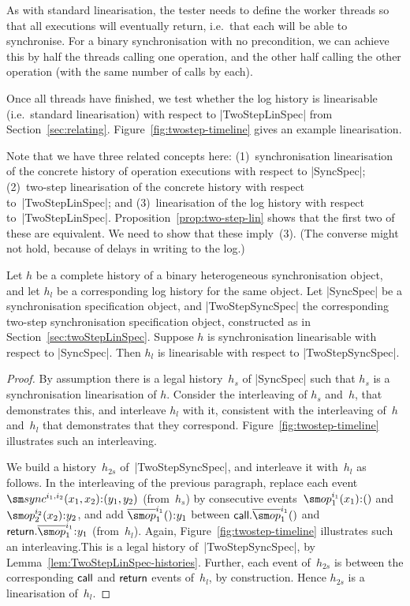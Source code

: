 
As with standard linearisation, the tester needs to define the worker
threads so that all executions will eventually return, i.e.~that each will be
able to synchronise.  For a binary synchronisation with no precondition, we
can achieve this by half the threads calling one operation, and the other half
calling the other operation (with the same number of calls by each).

Once all threads have finished, we test whether the log history is
linearisable (i.e.~standard linearisation) with respect to |TwoStepLinSpec|
from Section~\ref{sec:relating}.  Figure~\ref{fig:twostep-timeline} gives an
example linearisation. 

Note that we have three related concepts here: (1)~synchronisation
linearisation of the concrete history of operation executions with respect to
|SyncSpec|; (2)~two-step linearisation of the concrete history with respect
to~|TwoStepLinSpec|; and (3)~linearisation of the log history with respect
to~|TwoStepLinSpec|.  Proposition~\ref{prop:two-step-lin} shows that the first
two of these are equivalent.  We need to show that these imply~(3).  (The
converse might not hold, because of delays in writing to the log.)

\begin{prop}
\label{prop:twostep-testing}
Let $h$ be a complete history of a binary heterogeneous synchronisation
object, and let $h_l$ be a corresponding log history for the same object.  Let
|SyncSpec| be a synchronisation specification object, and |TwoStepSyncSpec|
the corresponding two-step synchronisation specification object, constructed
as in Section~\ref{sec:twoStepLinSpec}.  Suppose $h$ is synchronisation
linearisable with respect to |SyncSpec|.  Then $h_l$ is linearisable with
respect to |TwoStepSyncSpec|.
\end{prop}
%
\begin{proof}
By assumption there is a legal history~$h_s$ of |SyncSpec| such that $h_s$ is
a synchronisation linearisation of $h$.  Consider the interleaving of $h_s$
and~$h$, that demonstrates this, and interleave $h_l$ with it, consistent with
the interleaving of~$h$ and~$h_l$ that demonstrates that they correspond.
Figure~\ref{fig:twostep-timeline} illustrates such an interleaving.

We build a history~$h_{2s}$ of~|TwoStepSyncSpec|, and interleave it with~$h_l$
as follows.  In the interleaving of the previous paragraph, replace each event
$\sync^{i_1,i_2}(x_1,x_2)\::(y_1,y_2)$ (from~$h_s$) by consecutive
events~$\op_1^{i_1}(x_1)\::()$ and $\op_2^{i_2}(x_2)\::y_2$, and add
$\overline{\op}_1^{i_1}()\::y_1$ between $\call.\overline{\op}_1^{i_1}()$ and
$\return.\overline{\op}_1^{i_1} \:: y_1$ (from~$h_l$).  Again,
Figure~\ref{fig:twostep-timeline} illustrates such an interleaving.This is a
legal history of~|TwoStepSyncSpec|, by
Lemma~\ref{lem:TwoStepLinSpec-histories}.  Further, each event of~$h_{2s}$ is
between the corresponding $\mathsf{call}$ and $\mathsf{return}$ events of~$h_l$, by
construction.  Hence $h_{2s}$ is a linearisation of~$h_l$.
\end{proof}

